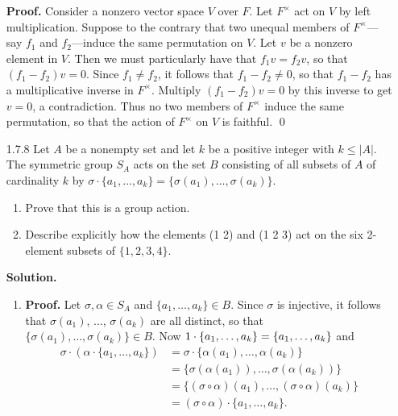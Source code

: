 \begin{enumerate}
      \textbf{Proof.} Consider a nonzero vector space $V$ over $F$. Let
      $F^\times$ act on $V$ by left multiplication. Suppose to the contrary that
      two unequal members of $F^\times$---say $f_1$ and $f_2$---induce the same 
      permutation on $V$. Let $v$ be a nonzero element in $V$. Then we must 
      particularly have that $f_1v = f_2v$, so that $(f_1 - f_2)v = 0$. Since
      $f_1 \neq f_2$, it follows that $f_1 - f_2 \neq 0$, so that $f_1 - f_2$
      has a multiplicative inverse in $F^\times$. Multiply $(f_1 - f_2)v = 0$
      by this inverse to get $v = 0$, a contradiction. Thus no two members of
      $F^\times$ induce the same permutation, so that the action of $F^\times$
      on $V$ is faithful. \qed
   \item[1.7.8]   Let $A$ be a nonempty set and let $k$ be a positive integer
                  with $k \le |A|$. The symmetric group $S_A$ acts on the set
                  $B$ consisting of all subsets of $A$ of cardinality $k$ by
                  $\sigma \cdot \{a_1, \ldots, a_k\} = \{\sigma(a_1), \ldots,
                   \sigma(a_k)\}$.
                  \begin{enumerate}
                     \item Prove that this is a group action.
                     \item Describe explicitly how the elements (1 2) and
                           (1 2 3) act on the six 2-element subsets of
                           $\{1, 2, 3, 4\}$.
                  \end{enumerate}

      \textbf{Solution.}
   
      \begin{enumerate}
         \item \textbf{Proof.} Let $\sigma, \alpha \in S_A$ and
               $\{a_1, \ldots, a_k\} \in B$. Since $\sigma$ is injective, it 
               follows that $\sigma(a_1)$, $\ldots$, $\sigma(a_k)$ are all 
               distinct, so that $\{\sigma(a_1), \ldots, \sigma(a_k)\} \in B$.
               Now $1 \cdot\nobreak \{a_1, \ldots, a_k\} = \{a_1, \ldots, a_k\}$
               and
               \begin{align*}
                  \sigma \cdot (\alpha \cdot \{a_1, \ldots, a_k\}) &=
                     \sigma \cdot \{\alpha(a_1), \ldots, \alpha(a_k)\} \\
                     &= \{\sigma(\alpha(a_1)), \ldots, \sigma(\alpha(a_k))\} \\
                     &= \{(\sigma\circ\alpha)(a_1), \ldots,
                          (\sigma\circ\alpha)(a_k)\} \\
                     &= (\sigma\circ\alpha) \cdot \{a_1, \ldots, a_k\}.
               \end{align*}
               

\end{enumerate}
\end{enumerate}

